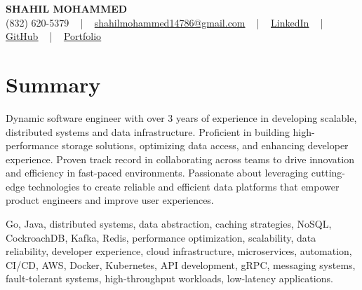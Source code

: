 \documentclass[letterpaper,10pt]{article}
\begin{document}
\begin{center}
    {\fontsize{14pt}{12pt}\selectfont \textbf{\MakeUppercase{Shahil Mohammed}}}\\ \vspace{2pt}
    \fontsize{10pt}{12pt}\selectfont (832) 620-5379 ~ | ~ \href{mailto:shahilmohammed14786@gmail.com}{shahilmohammed14786@gmail.com} ~ | ~  
    \href{https://www.linkedin.com/in/shahil-mohammed-9652931a1/}{\color{blue}\underline{LinkedIn}}  ~ | ~ 
    \href{https://github.com/freakbeast14}{\color{blue}\underline{GitHub}} ~ | ~ 
    \href{https://shahil-mohammed.netlify.app/}{\color{blue}\underline{Portfolio}}
    \vspace{-8pt}
\end{center}

\section{Summary}
\vspace{-2pt}\fontsize{8pt}{9pt}\selectfont
Dynamic software engineer with over 3 years of experience in developing scalable, distributed systems and data infrastructure. Proficient in building high-performance storage solutions, optimizing data access, and enhancing developer experience. Proven track record in collaborating across teams to drive innovation and efficiency in fast-paced environments. Passionate about leveraging cutting-edge technologies to create reliable and efficient data platforms that empower product engineers and improve user experiences.
\vspace{-5pt}

{\fontsize{1pt}{1pt}\selectfont\color{white}
Go, Java, distributed systems, data abstraction, caching strategies, NoSQL, CockroachDB, Kafka, Redis, performance optimization, scalability, data reliability, developer experience, cloud infrastructure, microservices, automation, CI/CD, AWS, Docker, Kubernetes, API development, gRPC, messaging systems, fault-tolerant systems, high-throughput workloads, low-latency applications.
}
\vspace{-8pt}

\vspace{-2pt}
\end{document}
